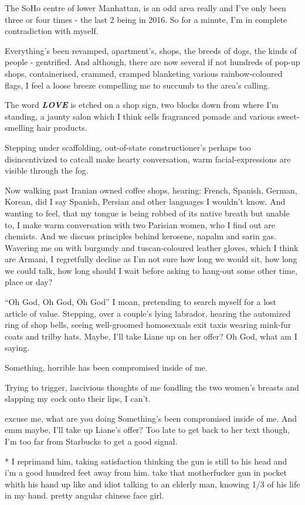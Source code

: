 \documentclass[19pt,openany]{book}
\begin{document}
The SoHo centre of lower
Manhattan, is an odd area
really and I've only been three
or four times - the last 2
being in 2016. So for a minute,
I'm in complete contradiction
with myself.

Everything's
been revamped, apartment's,
shops, the breeds
of dogs, the kinds
of people -
gentrified. And
although, there are now
several if not hundreds
of pop-up shops,
containerised, crammed,
cramped blanketing
various rainbow-coloured
flags, I feel a loose breeze
compelling me to succumb
to the area's calling.

The word \textit{\textbf{LOVE}}
is etched on a shop sign,
two blocks down from
where I'm standing, a jaunty
salon which I think
sells fragranced pomade
and various sweet-smelling
hair products.

Stepping under
scaffolding, out-of-state
constructioner's
perhaps too disincentivized
to catcall make hearty
conversation, warm
facial-expressions
are visible
through the fog.

Now walking past
Iranian owned coffee
shops, hearing:
French, Spanish,
German, Korean, did I
say Spanish, Persian
and other languages
I wouldn't know.
And wanting to feel,
that my tongue is being robbed
of its native breath but
unable to, I make
warm conversation with two
Parisian women,
who I find out are
chemists. And
we discuss principles
behind kerosene, napalm and
sarin gas. Wavering me on with
burgundy and
tuscan-coloured leather gloves,
which I think are Armani, I regretfully
decline as I'm not sure how long
we would sit, how long we could
talk, how long should
I wait before asking to hang-out
some other time, place or day?

``Oh God, Oh God, Oh God''
I moan, pretending
to search myself for a
lost article of value. Stepping,
over a couple's lying
labrador, hearing the
automized ring of shop
bells, seeing well-groomed
homosexuals exit taxis
wearing mink-fur coats and
trilby hats. Maybe, I'll
take Liane up on her offer?
Oh God, what am I saying.

Something, horrible has
been compromised inside of
me.

Trying to trigger,
lascivious thoughts
of me fondling the
two women's breasts and
slapping my cock onto
their lips, I can't.

excuse me, what
are you doing
Something's been compromised
inside of me. And emm maybe,
I'll take up Liane's
offer? Too late to get back
to her text though,
I'm too far
from Starbucks to get a good
signal.


* I reprimand
him, taking satisfaction
thinking the gun
is still to his head and i'm a
good hundred feet away
from him.
take that motherfucker
gun in pocket
whith his hand up
like and idiot
talking to an elderly
man, knowing 1/3 of his life
in my hand. pretty
angular chinese face girl.
\end{document}

